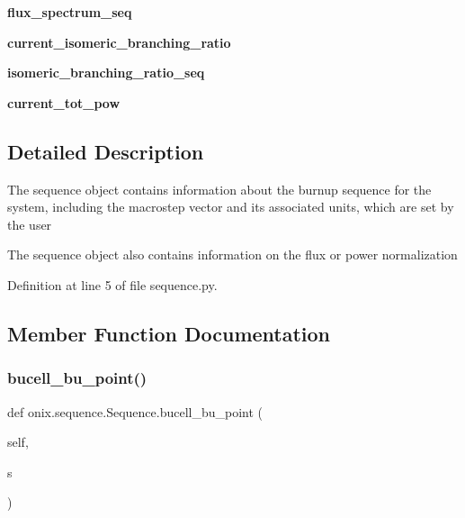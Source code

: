 \begin{DoxyCompactItemize}
{\bfseries flux\+\_\+spectrum\+\_\+seq}
\item 
\mbox{\label{classonix_1_1sequence_1_1Sequence_a24ad0de9d35724af7f1258ef5736d854}} 
{\bfseries current\+\_\+isomeric\+\_\+branching\+\_\+ratio}
\item 
\mbox{\label{classonix_1_1sequence_1_1Sequence_a1c530aff48d790a7cbfc46d53a7640bf}} 
{\bfseries isomeric\+\_\+branching\+\_\+ratio\+\_\+seq}
\item 
\mbox{\label{classonix_1_1sequence_1_1Sequence_ae4cb637a41fc9dad084a3dc22e77ec41}} 
{\bfseries current\+\_\+tot\+\_\+pow}
\end{DoxyCompactItemize}


\subsection{Detailed Description}
\begin{DoxyVerb}The sequence object contains information about the burnup sequence for the system,
 including the macrostep vector and its associated units, which are set by the user

The sequence object also contains information on the flux or power normalization\end{DoxyVerb}
 

Definition at line 5 of file sequence.\+py.



\subsection{Member Function Documentation}
\mbox{\label{classonix_1_1sequence_1_1Sequence_a1b3e9b5c744a2d66741a194bcacc4bba}} 
\subsubsection{\texorpdfstring{bucell\+\_\+bu\+\_\+point()}{bucell\_bu\_point()}}
{\footnotesize\ttfamily def onix.\+sequence.\+Sequence.\+bucell\+\_\+bu\+\_\+point (\begin{DoxyParamCaption}\item[{}]{self,  }\item[{}]{s }\end{DoxyParamCaption})}

